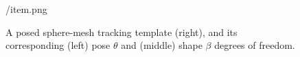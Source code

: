 \begin{figure}[t]
\centering
\begin{overpic} 
[width=\linewidth]
{\currfiledir/item.png}
\myfigurename{}
\end{overpic}
\caption{
% 
A posed sphere-mesh tracking template (right), and its corresponding (left) pose $\theta$ and (middle) shape $\beta$ degrees of freedom. 
% 
}
\label{fig:handmodel}
\end{figure}
